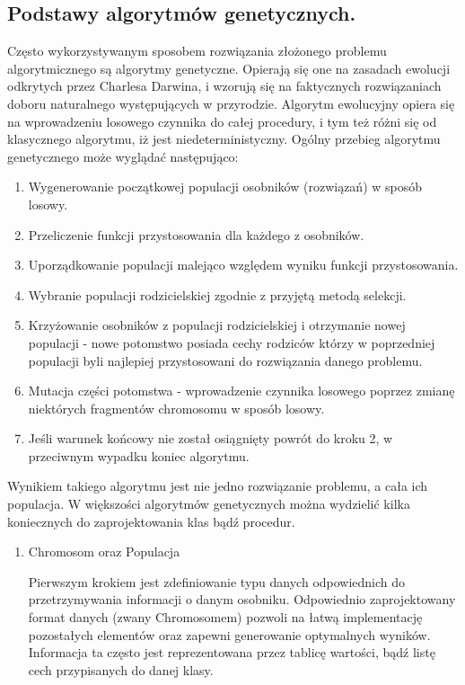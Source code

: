 \subsection{Podstawy algorytmów genetycznych.}
\begin{par}
Często wykorzystywanym sposobem rozwiązania złożonego problemu algorytmicznego są algorytmy genetyczne.
Opierają się one na zasadach ewolucji odkrytych przez Charlesa Darwina, i wzorują się na faktycznych rozwiązaniach doboru naturalnego występujących w przyrodzie.
Algorytm ewolucyjny opiera się na wprowadzeniu losowego czynnika do całej procedury, i tym też różni się od klasycznego algorytmu, iż jest niedeterministyczny. 
Ogólny przebieg algorytmu genetycznego może wyglądać następująco:
\begin{enumerate}
\item Wygenerowanie początkowej populacji osobników (rozwiązań) w sposób losowy.
\item Przeliczenie funkcji przystosowania dla każdego z osobników.
\item Uporządkowanie populacji malejąco względem wyniku funkcji przystosowania.
\item Wybranie populacji rodzicielskiej zgodnie z przyjętą metodą selekcji.
\item Krzyżowanie osobników z populacji rodzicielskiej i otrzymanie nowej populacji - nowe potomstwo posiada cechy rodziców którzy w poprzedniej populacji byli najlepiej przystosowani do rozwiązania danego problemu.
\item Mutacja części potomstwa - wprowadzenie czynnika losowego poprzez zmianę niektórych fragmentów chromosomu w sposób losowy.
\item Jeśli warunek końcowy nie został osiągnięty powrót do kroku 2, w przeciwnym wypadku koniec algorytmu.
\end{enumerate}
Wynikiem takiego algorytmu jest nie jedno rozwiązanie problemu, a cała ich populacja.
W większości algorytmów genetycznych można wydzielić kilka koniecznych do zaprojektowania klas bądź procedur.
\begin{enumerate}
\item Chromosom oraz Populacja
	\begin{par}
		Pierwszym krokiem jest zdefiniowanie typu danych odpowiednich do przetrzymywania informacji o danym osobniku.
		Odpowiednio zaprojektowany format danych (zwany Chromosomem) pozwoli na łatwą implementację pozostałych elementów oraz zapewni generowanie optymalnych wyników.
		Informacja ta często jest reprezentowana przez tablicę wartości, bądź listę cech przypisanych do danej klasy. 

\end{par}
\end{enumerate}
\end{par}
